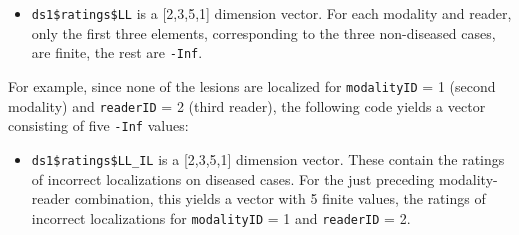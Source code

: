 \documentclass[
]{book}
\newenvironment{Shaded}{\begin{snugshade}}{\end{snugshade}}
\newcommand{\CommentTok}[1]{\textcolor[rgb]{0.56,0.35,0.01}{\textit{#1}}}
\newcommand{\DecValTok}[1]{\textcolor[rgb]{0.00,0.00,0.81}{#1}}
\newcommand{\NormalTok}[1]{#1}
\newcommand{\SpecialCharTok}[1]{\textcolor[rgb]{0.00,0.00,0.00}{#1}}
\providecommand{\tightlist}{%
  \setlength{\itemsep}{0pt}\setlength{\parskip}{0pt}}
\begin{document}
\begin{Shaded}
\end{Shaded}

\begin{itemize}
\tightlist
\item
  \texttt{ds1\$ratings\$LL} is a {[}2,3,5,1{]} dimension vector. For each modality and reader, only the first three elements, corresponding to the three non-diseased cases, are finite, the rest are \texttt{-Inf}.
\end{itemize}

For example, since none of the lesions are localized for \texttt{modalityID} = 1 (second modality) and \texttt{readerID} = 2 (third reader), the following code yields a vector consisting of five \texttt{-Inf} values:

\begin{Shaded}
\end{Shaded}

\begin{itemize}
\tightlist
\item
  \texttt{ds1\$ratings\$LL\_IL} is a {[}2,3,5,1{]} dimension vector. These contain the ratings of incorrect localizations on diseased cases. For the just preceding modality-reader combination, this yields a vector with 5 finite values, the ratings of incorrect localizations for \texttt{modalityID} = 1 and \texttt{readerID} = 2.
\end{itemize}

\begin{Shaded}
\end{Shaded}
\end{document}
